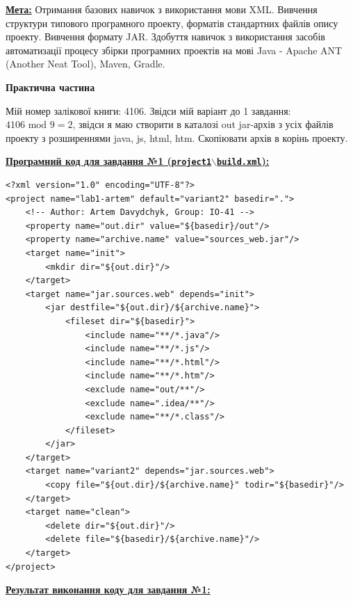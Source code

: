 \documentclass[12pt,a4paper]{article}
\begin{document}
    \textbf{\underline{Мета:}} Отримання базових навичок з використання мови XML.
    Вивчення структури типового програмного проекту, форматів стандартних файлів опису проекту.
    Вивчення формату JAR. Здобуття навичок з використання засобів автоматизації процесу збірки програмних проектів на мові Java - Apache ANT (Another Neat Tool),
    Maven, Gradle.

    \begin{center} \textbf{\Large Практична частина} \end{center}

    \setlength{\parindent}{1.5em}

    Мій номер залікової книги: 4106. Звідси мій варіант до 1 завдання: $4106\text{ mod }9 = 2$, звідси я маю
    створити в каталозі out jar-архів з усіх файлів проекту з розширеннями java, js, html, htm. Скопіювати архів в корінь проекту.

    \setlength{\parindent}{0em}

    \vspace{1em}

    \textbf{\underline{Програмний код для завдання №1 (\texttt{project1$\backslash$build.xml}):}}

    \begin{verbatim}
<?xml version="1.0" encoding="UTF-8"?>
<project name="lab1-artem" default="variant2" basedir=".">
    <!-- Author: Artem Davydchyk, Group: IO-41 -->
    <property name="out.dir" value="${basedir}/out"/>
    <property name="archive.name" value="sources_web.jar"/>
    <target name="init">
        <mkdir dir="${out.dir}"/>
    </target>
    <target name="jar.sources.web" depends="init">
        <jar destfile="${out.dir}/${archive.name}">
            <fileset dir="${basedir}">
                <include name="**/*.java"/>
                <include name="**/*.js"/>
                <include name="**/*.html"/>
                <include name="**/*.htm"/>
                <exclude name="out/**"/>
                <exclude name=".idea/**"/>
                <exclude name="**/*.class"/>
            </fileset>
        </jar>
    </target>
    <target name="variant2" depends="jar.sources.web">
        <copy file="${out.dir}/${archive.name}" todir="${basedir}"/>
    </target>
    <target name="clean">
        <delete dir="${out.dir}"/>
        <delete file="${basedir}/${archive.name}"/>
    </target>
</project>
    \end{verbatim}

    \newpage

    \textbf{\underline{Результат виконання коду для завдання №1:}}
\end{document}
